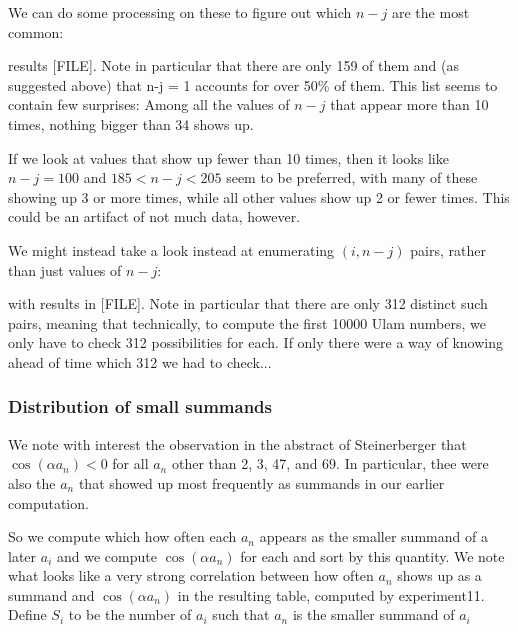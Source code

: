 \documentclass{article}
\theoremstyle{definition}
\theoremstyle{remark}
\numberwithin{equation}{section}
\begin{document}
{We can do some processing on these to figure out which $n-j$ are the
most common:


results [FILE].  Note in particular that there are only 159 of them
and (as suggested above) that n-j = 1 accounts for over 50\% of them.
This list seems to contain few surprises: Among all the values of $n-j$
that appear more than 10 times, nothing bigger than 34 shows up.

If we look at values that show up fewer than 10 times, then it looks
like $n-j = 100$ and $185 < n-j < 205$ seem to be preferred, with many
of these showing up 3 or more times, while all other values show up 2
or fewer times.  This could be an artifact of not much data, however.

We might instead take a look instead at enumerating $(i,n-j)$ pairs,
rather than just values of $n-j$:


with results in [FILE].  Note in particular that there are
only 312 distinct such pairs, meaning that technically, to compute the
first 10000 Ulam numbers, we only have to check 312 possibilities for
each.  If only there were a way of knowing ahead of time which 312 we
had to check...

\subsubsection{Distribution of small summands}

We note with interest the observation in the abstract of Steinerberger
that $\cos(\alpha a_n) < 0$ for all $a_n$ other than 2, 3, 47, and 69.  In
particular, thee were also the $a_n$ that showed up most frequently as
summands in our earlier computation.

So we compute which how often each $a_n$ appears as the smaller
summand of a later $a_i$ and we compute $\cos(\alpha a_n)$ for each
and sort by this quantity.  We note what looks like a very strong
correlation between how often $a_n$ shows up as a summand and
$\cos(\alpha a_n)$ in the resulting table, computed by experiment11.
Define $S_i$ to be the number of $a_i$ such that $a_n$ is the smaller
summand of $a_i$

}
\end{document}
